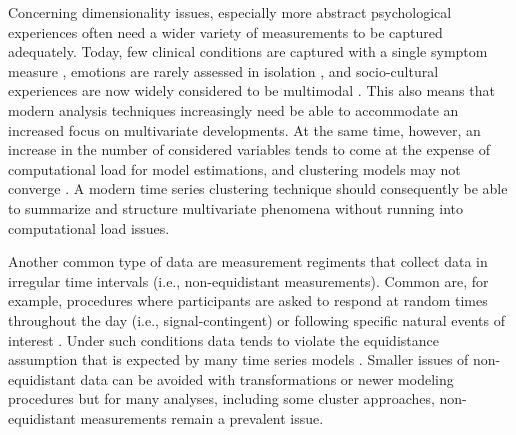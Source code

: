 \documentclass[man, 12pt, a4paper, mask, floatsintext]{apa7}
\theoremstyle{break}
\theoremstyle{plain}
\begin{document}
Concerning dimensionality issues, especially more abstract psychological experiences often need a wider variety of measurements to be captured adequately. Today, few clinical conditions are captured with a single symptom measure \citep[e.g.,][]{cramer2016}, emotions are rarely assessed in isolation \citep[e.g.,][]{reitsema2022}, and socio-cultural experiences are now widely considered to be multimodal \citep[e.g.,][]{Kreienkamp2022d}. This also means that modern analysis techniques increasingly need be able to accommodate an increased focus on multivariate developments. At the same time, however, an increase in the number of considered variables tends to come at the expense of computational load for model estimations, and clustering models may not converge \citep[the aforementioned dimensionality curse;][]{altman2018}. A modern time series clustering technique should consequently be able to summarize and structure multivariate phenomena without running into computational load issues.

Another common type of data are measurement regiments that collect data in irregular time intervals (i.e., non-equidistant measurements). Common are, for example, procedures where participants are asked to respond at random times throughout the day (i.e., signal-contingent) or following specific natural events of interest \citep[i.e., event-contingent; see][]{shiffman2008, myin-germeys2018}. Under such conditions data tends to violate the equidistance assumption that is expected by many time series models \citep[][]{hamaker2017}. Smaller issues of non-equidistant data can be avoided with transformations \citep[e.g., dynamic time warping,][]{berndt1994} or newer modeling procedures \citep[e.g., continuous-time models;][]{dehaan-rietdijk2017} but for many analyses, including some cluster approaches, non-equidistant measurements remain a prevalent issue. 
\end{document}
